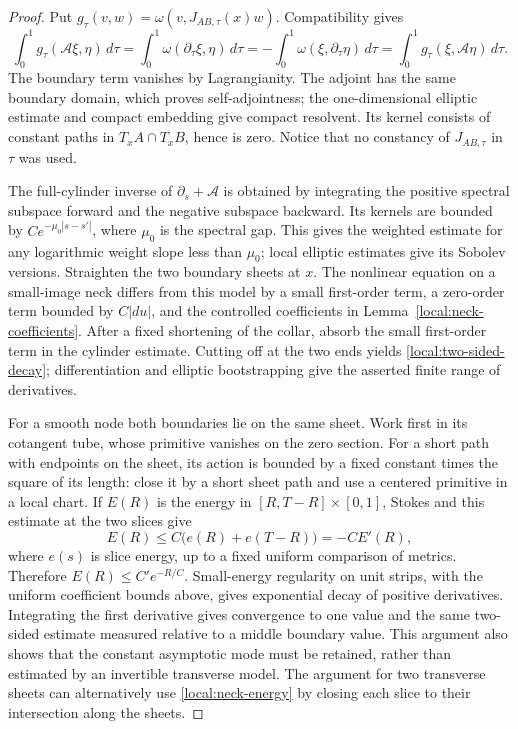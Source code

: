 \documentclass[11pt]{article}
\theoremstyle{definition}
\theoremstyle{remark}
\numberwithin{equation}{section}
\begin{document}
\begin{proof}
Put $g_\tau(v,w)=\omega(v,J_{AB,\tau}(x)w)$.  Compatibility gives
\[
 \int_0^1g_\tau(\mathcal A\xi,\eta)\,d\tau
   =\int_0^1\omega(\partial_\tau\xi,\eta)\,d\tau
   =-\int_0^1\omega(\xi,\partial_\tau\eta)\,d\tau
   =\int_0^1g_\tau(\xi,\mathcal A\eta)\,d\tau.
\]
The boundary term vanishes by Lagrangianity.  The adjoint has the same
boundary domain, which proves self-adjointness; the one-dimensional
elliptic estimate and compact embedding give compact resolvent.
Its kernel consists of constant paths in $T_xA\cap T_xB$, hence is zero.
Notice that no constancy of $J_{AB,\tau}$ in $\tau$ was used.

The full-cylinder inverse of $\partial_s+\mathcal A$ is obtained by
integrating the positive spectral subspace forward and the negative
subspace backward.  Its kernels are bounded by $Ce^{-\mu_0|s-s'|}$,
where $\mu_0$ is the spectral gap.  This gives the weighted estimate for
any logarithmic weight slope less than $\mu_0$; local elliptic estimates
give its Sobolev versions.  Straighten the two boundary sheets at $x$.
The nonlinear equation on a small-image neck differs from this model
by a small first-order term, a zero-order term bounded by $C|du|$, and
the controlled coefficients in Lemma~\ref{local:neck-coefficients}.
After a fixed shortening of the collar, absorb the small first-order
term in the cylinder estimate.  Cutting off at the two ends yields
\eqref{local:two-sided-decay}; differentiation and elliptic bootstrapping
give the asserted finite range of derivatives.

For a smooth node both boundaries lie on the same sheet.  Work first
in its cotangent tube, whose primitive vanishes on the zero section.
For a short path with endpoints on the sheet, its action is bounded
by a fixed constant times the square of its length: close it by a
short sheet path and use a centered primitive in a local chart.  If
$E(R)$ is the energy in $[R,T-R]\times[0,1]$, Stokes and this estimate
at the two slices give
\begin{equation}\label{local:neck-energy}
 E(R)\leq C\bigl(e(R)+e(T-R)\bigr)=-C E'(R),
\end{equation}
where $e(s)$ is slice energy, up to a fixed uniform comparison of
metrics.  Therefore $E(R)\leq C'e^{-R/C}$.  Small-energy regularity on
unit strips, with the uniform coefficient bounds above, gives
exponential decay of positive derivatives.  Integrating the first
derivative gives convergence to one value and the same two-sided
estimate measured relative to a middle boundary value.  This argument
also shows that the constant asymptotic mode must be retained, rather
than estimated by an invertible transverse model.  The argument for
two transverse sheets can alternatively use \eqref{local:neck-energy}
by closing each slice to their intersection along the sheets.
\end{proof}
\end{document}
